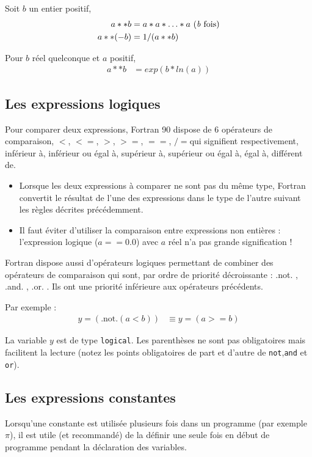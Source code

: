\documentclass[a4paper,twoside]{article}
\begin{document}
Soit $b$ un entier positif, 
\begin{align}
a**b &= a*a*\ldots*a \text{ (\emph{b} fois)}\\
a**(-b) &= 1/(a**b)
\end{align}

Pour $b$ réel quelconque et $a$ positif,
\begin{align}
a**b &= exp(b*ln(a))
\end{align}

\subsection{Les expressions logiques}
Pour comparer deux expressions, Fortran 90 dispose de 6 opérateurs de comparaison, \og $<$\fg, \og $<=$\fg, \og $>$\fg, \og $>=$\fg, \og $==$\fg, \og $/=$\fg qui signifient respectivement, inférieur à, inférieur ou égal à, supérieur à, supérieur ou égal à, égal à, différent de. 

\begin{itemize}
\item Lorsque les deux expressions à comparer ne sont pas du même type, Fortran convertit le résultat de l'une des expressions dans le type de l'autre suivant les règles décrites précédemment.

\item Il faut éviter d'utiliser la comparaison entre expressions non 
entières : l'expression logique ($a == 0.0$) avec $a$ réel n'a pas grande 
signification ! 
\end{itemize}

Fortran dispose aussi d'opérateurs logiques permettant de 
combiner des opérateurs de compa\-rai\-son qui sont, par ordre de 
priorité décroissante : \og .not. \fg, \og .and. \fg, \og .or. \fg. Ils ont une 
priorité inférieure aux opérateurs précédents. 

Par exemple :
\begin{align}
y = (\mbox{.not.}(a<b)) &\equiv y = (a>=b) 
\end{align}

La variable $y$ est de type \texttt{logical}. Les parenthèses ne sont 
pas obligatoires mais facilitent la lecture (notez les points 
obligatoires de part et d'autre de \texttt{not},\texttt{and} et \texttt{or}).

\subsection{Les expressions constantes}\label{sec:constantes}
Lorsqu'une constante est utilisée plusieurs fois dans un programme (par exemple $\pi$), il est utile (et recommandé) de la définir une seule fois en début de programme pendant la déclaration des variables.
 
\end{document}
